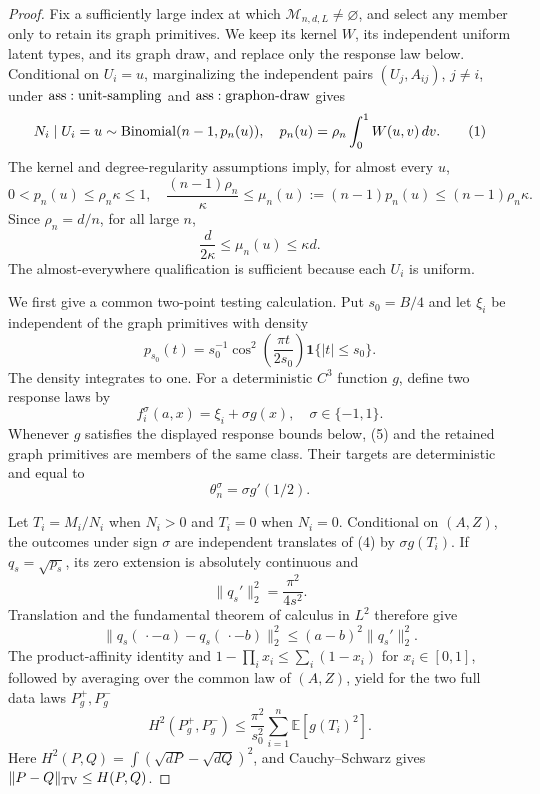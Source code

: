 \documentclass{article}
\begin{document}
\begin{proof}
Fix a sufficiently large index at which \(\mathcal M_{n,d,L}\ne\varnothing\), and select any member only to retain its graph primitives.  We keep its kernel \(W\), its independent uniform latent types, and its graph draw, and replace only the response law below.  Conditional on \(U_i=u\), marginalizing the independent pairs \((U_j,A_{ij})\), \(j\ne i\), under \({\rm ass:unit\text{-}sampling}\) and \({\rm ass:graphon\text{-}draw}\) gives
\[
 N_i\mid U_i=u\sim{\rm Binomial}(n-1,p_n(u)),
 \quad p_n(u)=\rho_n\int_0^1W(u,v)\,dv.
\tag{1}
\]
The kernel and degree-regularity assumptions imply, for almost every \(u\),
\[
 0<p_n(u)\leq\rho_n\kappa\leq1,\quad
 \frac{(n-1)\rho_n}{\kappa}
 \leq\mu_n(u):=(n-1)p_n(u)
 \leq(n-1)\rho_n\kappa.
\tag{2}
\]
Since \(\rho_n=d/n\), for all large \(n\),
\[
 \frac d{2\kappa}\leq\mu_n(u)\leq\kappa d.
\tag{3}
\]
The almost-everywhere qualification is sufficient because each \(U_i\) is uniform.

We first give a common two-point testing calculation.  Put \(s_0=B/4\) and let \(\xi_i\) be independent of the graph primitives with density
\[
 p_{s_0}(t)=s_0^{-1}\cos^2\!\left(\frac{\pi t}{2s_0}\right)
 \mathbf1\{|t|\leq s_0\}.
\tag{4}
\]
The density integrates to one.  For a deterministic \(C^3\) function \(g\), define two response laws by
\[
 f_i^\sigma(a,x)=\xi_i+\sigma g(x),\quad \sigma\in\{-1,1\}.
\tag{5}
\]
Whenever \(g\) satisfies the displayed response bounds below, (5) and the retained graph primitives are members of the same class.  Their targets are deterministic and equal to
\[
 \theta_n^\sigma=\sigma g'(1/2).
\tag{6}
\]

Let \(T_i=M_i/N_i\) when \(N_i>0\) and \(T_i=0\) when \(N_i=0\).  Conditional on \((A,Z)\), the outcomes under sign \(\sigma\) are independent translates of (4) by \(\sigma g(T_i)\).  If \(q_s=\sqrt{p_s}\), its zero extension is absolutely continuous and
\[
 \|q_s'\|_2^2=\frac{\pi^2}{4s^2}.
\tag{7}
\]
Translation and the fundamental theorem of calculus in \(L^2\) therefore give
\[
 \|q_s(\,\cdot-a)-q_s(\,\cdot-b)\|_2^2
 \leq(a-b)^2\|q_s'\|_2^2.
\tag{8}
\]
The product-affinity identity and \(1-\prod_i x_i\leq\sum_i(1-x_i)\) for \(x_i\in[0,1]\), followed by averaging over the common law of \((A,Z)\), yield for the two full data laws \(P_g^+,P_g^-\)
\[
 H^2(P_g^+,P_g^-)
 \leq\frac{\pi^2}{s_0^2}\sum_{i=1}^n\mathbb E[g(T_i)^2].
\tag{9}
\]
Here \(H^2(P,Q)=\int(\sqrt{dP}-\sqrt{dQ})^2\), and Cauchy--Schwarz gives \(\|P-Q\|_{\rm TV}\leq H(P,Q)\).


\end{proof}
\end{document}
